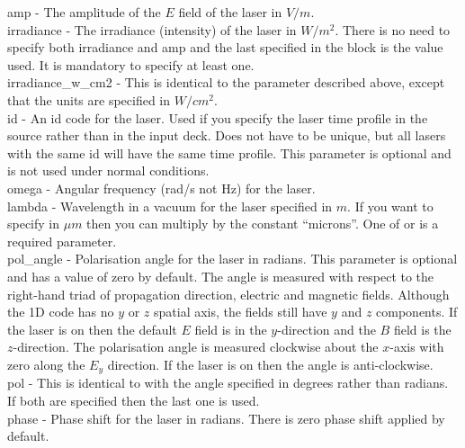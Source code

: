 {\emphtext amp} - The amplitude of the $E$ field of the laser in $V/m$.\\

{\emphtext irradiance} - The irradiance (intensity) of the laser in $W/m^2$.
There is no need to specify both irradiance and amp and the last specified
in the block is the value used. It is mandatory to specify at least one.\\

{\emphtext irradiance\_w\_cm2} - This is identical to the 
 parameter described above, except that the units
are specified in $W/cm^2$.\\

{\emphtext id} - An id code for the laser. Used if you specify the laser time
profile in the {\EPOCH} source rather than in the input deck. Does not have to
be unique, but all lasers with the same id will have the same time profile.
This parameter is optional and is not used under normal conditions.\\

{\emphtext omega} - Angular frequency (rad/s not Hz) for the laser.\\

{\emphtext lambda} - Wavelength in a vacuum for the laser specified in $m$.
If you want to specify in $\mu m$ then you can multiply by the constant
``microns''. One of  or  is a
required parameter.\\

{\emphtext pol\_angle} - Polarisation angle for the laser in radians.
This parameter is optional and has a value of zero by default.
The angle is measured with respect to the right-hand triad of propagation
direction, electric and magnetic fields. Although the 1D code has no $y$
or $z$ spatial axis, the fields still have $y$ and $z$ components.
If the laser is on  then the default $E$ field is in
the $y$-direction and the $B$ field is the $z$-direction. The polarisation
angle is measured clockwise about the $x$-axis with zero along the $E_y$
direction. If the laser is on  then the angle is
anti-clockwise.\\

{\emphtext pol} - This is identical to  with the angle
specified in degrees rather than radians. If both are specified then the
last one is used.\\

{\emphtext phase} - Phase shift for the laser in radians. 
There is zero phase shift applied by default.\\

